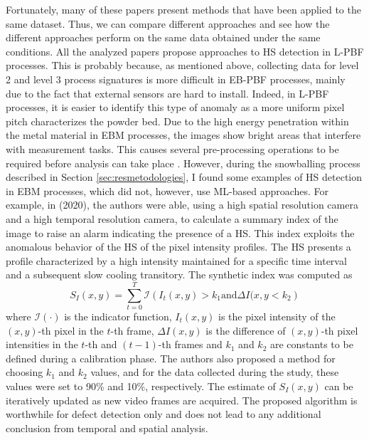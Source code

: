 Fortunately, many of these papers present methods that have been applied to the same dataset. Thus, we can compare different approaches and see how the different approaches perform on the same data obtained under the same conditions. All the analyzed papers propose approaches to HS detection in L-PBF processes. This is probably because, as mentioned above, collecting data for level 2 and level 3 process signatures is more difficult in EB-PBF processes, mainly due to the fact that external sensors are hard to install. Indeed, in L-PBF processes, it is easier to identify this type of anomaly as a more uniform pixel pitch characterizes the powder bed. Due to the high energy penetration within the metal material in EBM processes, the images show bright areas that interfere with measurement tasks. This causes several pre-processing operations to be required before analysis can take place \cite{grasso_powder_2020}. However, during the snowballing process described in Section \ref{sec:resmetodologies}, I found some examples of HS detection in EBM processes, which did not, however, use ML-based approaches. For example, in \citeauthor{grasso_powder_2020} (2020), the authors were able, using a high spatial resolution camera and a high temporal resolution camera, to calculate a summary index of the image to raise an alarm indicating the presence of a HS. This index exploits the anomalous behavior of the HS of the pixel intensity profiles. The HS presents a profile characterized by a high intensity maintained for a specific time interval and a subsequent slow cooling transitory. The synthetic index was computed as 
\begin{equation}
    \label{eq:sinteticgrassohs}
    S_I(x, y)=\sum_{t=0}^T \mathcal{I}\left( I_t(x, y) > k_1 \text{and} \Delta I(x, y<k_2 \right)
\end{equation}
where $\mathcal{I}(\cdot)$ is the indicator function, $I_t(x, y)$ is the pixel intensity of the $(x, y)$-th pixel in the $t$-th frame, $\Delta I(x, y)$ is the difference of $(x, y)$-th pixel intensities in the $t$-th and $(t-1)$-th frames and $k_1$ and $k_2$ are constants to be defined during a calibration phase. The authors also proposed a method for choosing $k_1$ and $k_2$ values, and for the data collected during the study, these values were set to 90\% and 10\%, respectively. The estimate of $S_I(x, y)$ can be iteratively updated as new video frames are acquired. The proposed algorithm is worthwhile for defect detection only and does not lead to any additional conclusion from temporal and spatial analysis.


